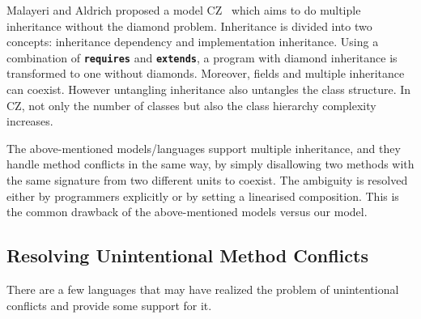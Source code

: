 Malayeri and Aldrich proposed a model CZ~\cite{malayeri2009cz} which
aims to do multiple inheritance without the diamond problem.
Inheritance is divided into two concepts: inheritance dependency and
implementation inheritance.  Using a combination of
\textbf{\texttt{requires}} and \textbf{\texttt{extends}}, a program
with diamond inheritance is transformed to one without
diamonds. Moreover, fields and multiple inheritance can coexist.
However untangling inheritance also untangles the class structure. In
CZ, not only the number of classes but also the class hierarchy
complexity increases.

The above-mentioned models/languages support multiple inheritance, and
they handle method conflicts in the same way, by simply disallowing
two methods with the same signature from two different units to
coexist. The ambiguity is resolved either by programmers explicitly or
by setting a linearised composition. This is the common drawback of
the above-mentioned models versus our model.

\subsection{Resolving Unintentional Method Conflicts}
There are a few languages that may have realized the problem of
unintentional conflicts and provide some support for it.


